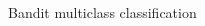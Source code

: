\documentclass{beamer}
\begin{document}
\begin{frame}{Bandit multiclass classification}
\begin{minipage}{0.35\textwidth}
\begin{columns}
\begin{column}{0.35\textwidth}
\vspace{-1.5cm}
\\

\end{column}
\end{columns}
\end{minipage}
\end{frame}
\end{document}
